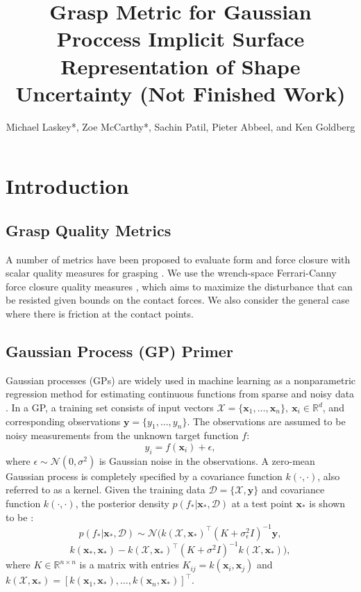 \documentclass[letterpaper, 10 pt, conference]{ieeeconf}  %
\title{\LARGE \bf
Grasp Metric for Gaussian Proccess Implicit Surface Representation of Shape Uncertainty (Not Finished Work) }
\author{Michael Laskey*, Zoe McCarthy*, Sachin Patil, Pieter Abbeel, and Ken Goldberg}%
\newcommand{\by}{\mathbf{y}}
\newcommand{\bx}{\mathbf{x}}
\newcommand{\mX}{\mathcal{X}}
\newcommand{\mD}{\mathcal{D}}
\newcommand{\mN}{\mathcal{N}}
\begin{document}
\maketitle
\thispagestyle{empty}
\pagestyle{empty}





\section{Introduction}

\vspace{10pt}
\subsection{Grasp Quality Metrics}
 A number of metrics have been proposed to evaluate form and force closure with scalar quality measures for grasping \cite{bicchi2000}.
We use the wrench-space Ferrari-Canny force closure quality measures \cite{ferrari1992}, which aims to maximize the disturbance that can be resisted given bounds on the contact forces.
We also consider the general case where there is friction at the contact points.\\


\subsection{Gaussian Process (GP) Primer}
 Gaussian processes (GPs) are widely used in machine learning as a nonparametric regression method for estimating continuous functions from sparse and noisy data \cite{rasmussen2006}.
In a GP, a training set consists of input vectors $\mX = \{\bx_1, \ldots, \bx_n\}, ~\bx_i \in \mathbb{R}^d$, and corresponding observations $\by = \{y_1, \ldots, y_n\}$.
The observations are assumed to be noisy measurements from the unknown target function $f$:
\begin{equation}
y_i = f(\bx_i) + \epsilon,
\end{equation}
where $\epsilon \sim \mN(0,\sigma^2)$ is Gaussian noise in the observations.
A zero-mean Gaussian process is completely specified by a covariance function $k(\cdot,\cdot)$, also referred to as a kernel.
Given the training data $\mD = \{\mX, \by\}$ and covariance function $k(\cdot,\cdot)$, the posterior density $p(f_*|\bx_*,\mD)$ at a test point $\bx_{*}$ is shown to be \cite{rasmussen2006}:
\begin{equation}
  p(f_*|\bx_*,\mD) 
  \sim 
  \mN\big(k(\mX,\bx_*)^{\intercal}(K + \sigma_{\epsilon}^2I)^{-1}\by,
\end{equation}
\[
  k(\bx_*,\bx_*)-k(\mX,\bx_*)^{\intercal}(K+\sigma^2I)^{-1}k(\mX,\bx_*)\big), \label{eq:GPposterior}
\]
where $K \in \mathbb{R}^{n \times n}$ is a matrix with entries $K_{ij} = k(\bx_i,\bx_j)$ and $k(\mX,\bx_*) = [k(\bx_1,\bx_*),\ldots,k(\bx_n,\bx_*)]^{\intercal}$. 
\end{document}
